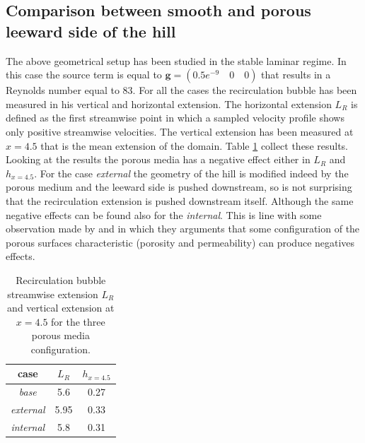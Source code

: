 \subsection{Comparison between smooth and porous leeward side of the hill}

The above geometrical setup has been studied in the stable laminar regime. In this case the source term is equal to $\mathbf{g} = (0.5e^{-9} \quad0 \quad0)$ that results in a Reynolds number equal to $83$.
For all the cases the recirculation bubble has been measured in his vertical and horizontal extension. The horizontal extension $L_R$ is defined as the first streamwise point in which a sampled velocity profile shows only positive streamwise velocities. The vertical extension has been measured at $x=4.5$ that is the mean extension of the domain.
Table \ref{tb:bubble} collect these results. Looking at the results the porous media has a negative effect either in $L_R$ and $h_{x=4.5}$. For the case \textit{external} the geometry of the hill is modified indeed by the porous medium and the leeward side is pushed downstream, so is not surprising that the recirculation extension is pushed downstream itself. Although the same negative effects can be found also for the \textit{internal}. This is line with some observation made by \citet{jimenez2001turbulent} and \citet{segura2017permeable} in which they arguments that some configuration of the porous surfaces characteristic (porosity and permeability) can produce negatives effects.

\begin{table}[h]
	\centering
	\begin{tabular}{c|c|c}
		case & $L_R$ & $h_{x=4.5}$ \\ 
		\hline 
		\hline 
		\textit{base} & 5.6 & 0.27 \\ 
		\hline 
		\textit{external} & 5.95 & 0.33 \\ 
		\hline 
		\textit{internal} & 5.8 & 0.31 \\ 
		\hline 
		\hline 
	\end{tabular}
	\caption{Recirculation bubble streamwise extension $L_R$ and vertical extension at $x=4.5$ for the three porous media configuration.}
	\label{tb:bubble}
\end{table}

